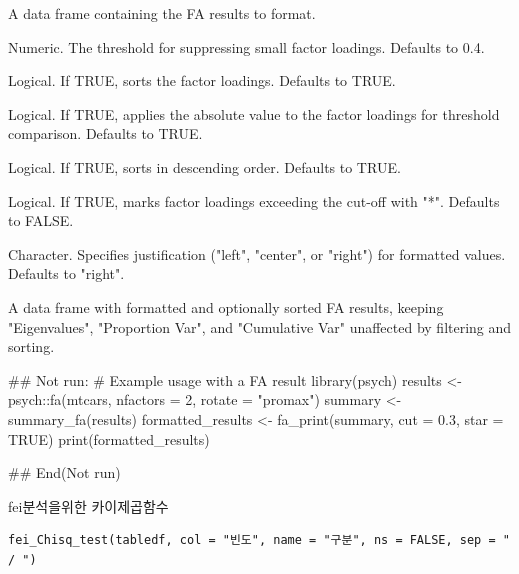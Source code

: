 \documentclass[a4paper]{book}
\begin{document}
\begin{Arguments}
\begin{ldescription}
\item[\code{data}] A data frame containing the FA results to format.

\item[\code{cut}] Numeric. The threshold for suppressing small factor loadings. Defaults to 0.4.

\item[\code{sort}] Logical. If TRUE, sorts the factor loadings. Defaults to TRUE.

\item[\code{abs}] Logical. If TRUE, applies the absolute value to the factor loadings for threshold comparison. Defaults to TRUE.

\item[\code{desc}] Logical. If TRUE, sorts in descending order. Defaults to TRUE.

\item[\code{star}] Logical. If TRUE, marks factor loadings exceeding the cut-off with "*". Defaults to FALSE.

\item[\code{justify}] Character. Specifies justification ("left", "center", or "right") for formatted values. Defaults to "right".
\end{ldescription}
\end{Arguments}
%
\begin{Value}
A data frame with formatted and optionally sorted FA results, keeping "Eigenvalues",
"Proportion Var", and "Cumulative Var" unaffected by filtering and sorting.
\end{Value}
%
\begin{Examples}
\begin{ExampleCode}
## Not run: 
# Example usage with a FA result
library(psych)
results <- psych::fa(mtcars, nfactors = 2, rotate = "promax")
summary <- summary_fa(results)
formatted_results <- fa_print(summary, cut = 0.3, star = TRUE)
print(formatted_results)

## End(Not run)
\end{ExampleCode}
\end{Examples}
%
\begin{Description}
fei분석을위한 카이제곱함수
\end{Description}
%
\begin{Usage}
\begin{verbatim}
fei_Chisq_test(tabledf, col = "빈도", name = "구분", ns = FALSE, sep = " / ")
\end{verbatim}
\end{Usage}
\end{document}
